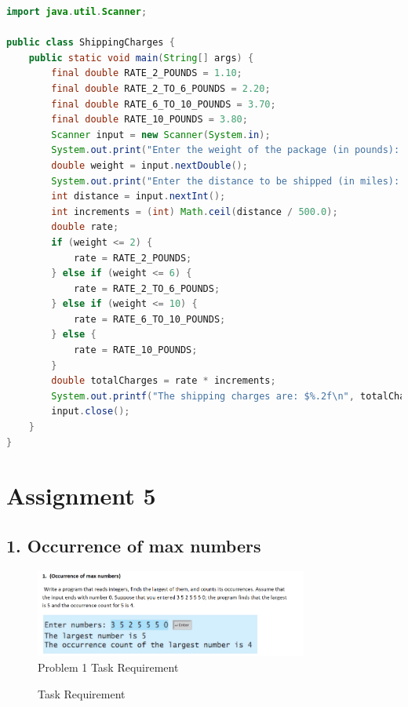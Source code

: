 \documentclass{article}
\begin{document}
\begin{lstlisting}[language=Java, caption=ShippingCharges.java]
import java.util.Scanner;

public class ShippingCharges {
    public static void main(String[] args) {
        final double RATE_2_POUNDS = 1.10;
        final double RATE_2_TO_6_POUNDS = 2.20;
        final double RATE_6_TO_10_POUNDS = 3.70;
        final double RATE_10_POUNDS = 3.80;
        Scanner input = new Scanner(System.in);
        System.out.print("Enter the weight of the package (in pounds): ");
        double weight = input.nextDouble();
        System.out.print("Enter the distance to be shipped (in miles): ");
        int distance = input.nextInt();
        int increments = (int) Math.ceil(distance / 500.0);
        double rate;
        if (weight <= 2) {
            rate = RATE_2_POUNDS;
        } else if (weight <= 6) {
            rate = RATE_2_TO_6_POUNDS;
        } else if (weight <= 10) {
            rate = RATE_6_TO_10_POUNDS;
        } else {
            rate = RATE_10_POUNDS;
        }
        double totalCharges = rate * increments;
        System.out.printf("The shipping charges are: $%.2f\n", totalCharges);
        input.close();
    }
}
\end{lstlisting}

\section*{Assignment 5}

\subsection*{1. Occurrence of max numbers}
\begin{figure}[H]
    \centering
    \includegraphics[width=0.8\textwidth]{./Assets/Task requirements/Assignment5/1.png}
    \caption{Problem 1 Task Requirement}
\end{figure}

\begin{figure}[h]
    \centering
    \caption{Task Requirement}
\end{figure}
\end{document}
